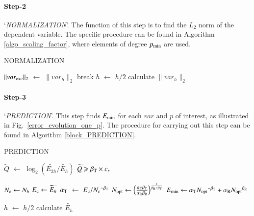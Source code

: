 \documentclass[review,3p]{elsarticle}
\begin{document}
\paragraph{Step-2} `\textit{NORMALIZATION}'. The function of this step is to find the $L_2$ norm of the dependent variable. The specific procedure can be found in Algorithm \ref{algo_scaling_factor}, where elements of degree $p_{\rm min}$ are used. 

\vspace{0.2cm}
\begin{algorithm}[H]
\caption{NORMALIZATION}
\label{algo_scaling_factor}
{
    {
        $\|var_{\rm exc}\|_{2}$ $\gets$ $\|var_{h}\|_{2}$\;
        break\;
    }
    {
        $h$ $\gets$ $h/2$\;
        calculate $\|var_h\|_{2}$\;    
    }
}
\end{algorithm}
                                                                   
\paragraph{Step-3} `\textit{PREDICTION}'. This step finds $E_{\rm min}$ for each $var$ and $p$ of interest, as illustrated in Fig.~\ref{error_evolution_one_p}.
The procedure for carrying out this step can be found in Algorithm \ref{block_PREDICTION}.

\vspace{0.2cm}
\begin{algorithm}[H]
\caption{PREDICTION}			%
\label{block_PREDICTION}
    {
        $\widetilde{Q}$ $\gets$ $\log _2 \left( {\widetilde {E_{2h}}}/{\widetilde {E_{h}}} \right)$\;
        \eIf
        {
            $\widetilde{Q} \geqslant \beta_{\rm T} \times c_r$
        }
        {
            $N_{\rm c} \gets N_h$\;
            $E_{\rm c} \gets \widetilde {E_{h}}$\;
            $\alpha_{\rm T}$ $\gets$ ${E_{\rm c}}/{N_{\rm c}}^{- \beta_{\rm T}}$\;
            $N_{\rm opt} \gets \left( \frac{\alpha_{\rm T} \beta_{\rm T}}{\alpha _{\rm R} \beta_{\rm R}} \right)^{\frac{1}{\beta_{\rm R} + \beta_{\rm T}}}$\;
            $E_{\rm min} \gets \alpha_{\rm T} {N_{\rm opt}}^{- {\beta _{\rm T}}} + \alpha_{\rm R} {N_{\rm opt}}^{{\beta _{\rm R}}}$\;

        }
        {
            $h$ $\gets$ $h/2$\;
            calculate $\widetilde {E_{h}}$\;
        }
	}    
\end{algorithm}
\end{document}
